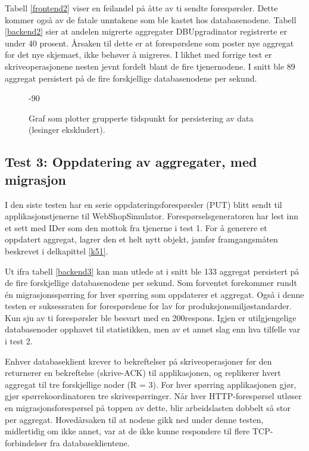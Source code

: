 Tabell \ref{frontend2} viser en feilandel på åtte av ti sendte forespørsler. Dette kommer også av de fatale unntakene som ble kastet hos databasenodene. Tabell \ref{backend2} sier at andelen migrerte aggregater DBUpgradinator registrerte er under 40 prosent. Årsaken til dette er at forespørslene som poster nye aggregat for det nye skjemaet, ikke behøver å migreres. I likhet med forrige test er skriveoperasjonene nesten jevnt fordelt blant de fire tjenernodene. I snitt ble 89 aggregat persistert på de fire forskjellige databasenodene per sekund.

\begin{figure}[hbtp]
  \begin{turn}{-90}
    
  \end{turn}{-90}
  \caption{Graf som plotter grupperte tidspunkt for persistering av data (lesinger ekskludert).}
  \label{plott2}
\end{figure}

\subsection{Test 3: Oppdatering av aggregater, med migrasjon}

I den siste testen har en serie oppdateringsforespørsler (PUT) blitt sendt til applikasjonstjenerne til WebShopSimulator. Forespørsels\-generatoren har lest inn et sett med IDer som den mottok fra tjenerne i test 1. For å generere et oppdatert aggregat, lagrer den et helt nytt objekt, jamfør framgangsmåten beskrevet i delkapittel \ref{k51}.




Ut ifra tabell \ref{backend3} kan man utlede at i snitt ble 133 aggregat persistert på de fire forskjellige databasenodene per sekund. Som forventet forekommer rundt én migrasjonsspørring for hver spørring som oppdaterer et aggregat. Også i denne testen er suksessraten for forespørslene for lav for produksjonsmiljø\-standarder. Kun sju av ti forespørsler ble besvart med en 200\-respons. Igjen er utilgjengelige databasenoder opphavet til statistikken, men av et annet slag enn hva tilfelle var i test 2.

Enhver databaseklient krever to bekreftelser på skriveoperasjoner før den returnerer en bekreftelse (skrive-ACK) til applikasjonen, og replikerer hvert aggregat til tre forskjellige noder (R = 3). For hver spørring applikasjonen gjør, gjør spørrekoordinatoren tre skrivespørringer. Når hver HTTP-forespørsel utløser en migrasjonsforespørsel på toppen av dette, blir arbeidslasten dobbelt så stor per aggregat. Hovedårsaken til at nodene gikk ned under denne testen, midlertidig om ikke annet, var at de ikke kunne respondere til flere TCP-forbindelser fra databaseklientene.

